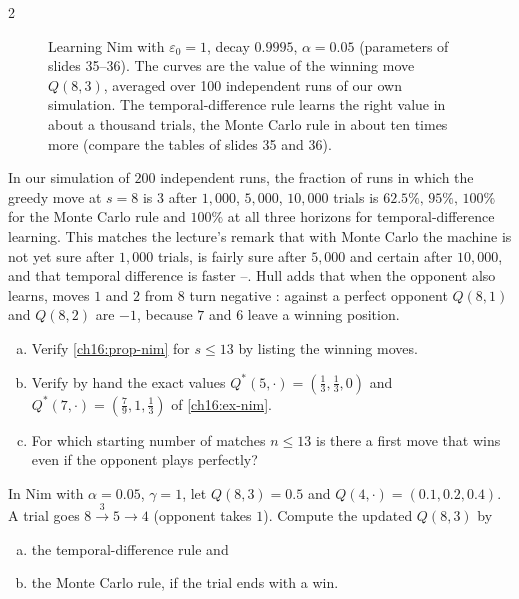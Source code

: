 \begin{paracol}{2}
\begin{figure}[ht]
\caption{Learning Nim with $\varepsilon_0=1$, decay $0.9995$, $\alpha=0.05$ (parameters of slides 35--36). The curves are the value of the winning move $Q(8,3)$, averaged over 100 independent runs of our own simulation. The temporal-difference rule learns the right value in about a thousand
trials, the Monte Carlo rule in about ten times more (compare the tables of slides 35 and 36).}\label{ch16:fig-nim}
\end{figure}
In our simulation of $200$ independent runs, the fraction of runs in which the greedy move at $s=8$ is $3$ after $1{,}000$, $5{,}000$, $10{,}000$ trials is $62.5\%,\,95\%,\,100\%$ for the Monte Carlo rule and $100\%$ at all three horizons for temporal-difference learning. This matches the lecture's remark that with Monte Carlo the machine is not yet sure after $1{,}000$ trials, is
fairly sure after $5{,}000$ and certain after $10{,}000$, and that temporal difference is faster --. Hull adds that when the opponent also learns, moves $1$ and $2$ from $8$ turn negative : against a perfect opponent $Q(8,1)$ and $Q(8,2)$ are $-1$, because $7$ and $6$ leave a winning position.

\begin{exercise}
\leavevmode
\begin{enumerate}[(a)]
  \item Verify \cref{ch16:prop-nim} for $s\le13$ by listing the winning moves.
  \item Verify by hand the exact values $Q^*(5,\cdot)=(\tfrac13,\tfrac13,0)$ and $Q^*(7,\cdot)=(\tfrac79,1,\tfrac13)$ of \cref{ch16:ex-nim}.
  \item For which starting number of matches $n\le13$ is there a first move that wins even if the opponent plays perfectly?
\end{enumerate}
\end{exercise}

\begin{exercise}
In Nim with $\alpha=0.05$, $\gamma=1$, let $Q(8,3)=0.5$ and $Q(4,\cdot)=(0.1,0.2,0.4)$. A trial goes $8\xrightarrow{3}5\to4$ (opponent takes $1$). Compute the updated $Q(8,3)$ by
\begin{enumerate}[(a)]
  \item the temporal-difference rule and
  \item the Monte Carlo rule, if the trial ends with a win.
\end{enumerate}
\end{exercise}


\end{paracol}
